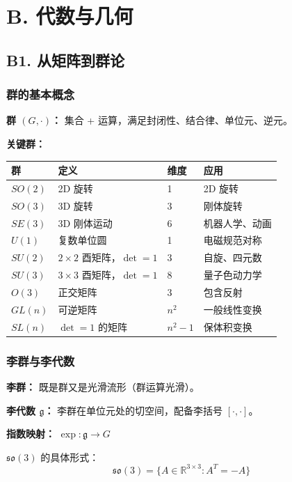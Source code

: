 \section{B. 代数与几何}

\subsection{B1. 从矩阵到群论}

\subsubsection{群的基本概念}

\textbf{群 $(G, \cdot)$：} 集合 + 运算，满足封闭性、结合律、单位元、逆元。

\textbf{关键群：}
\begin{center}
\begin{tabular}{llll}
\toprule
\textbf{群} & \textbf{定义} & \textbf{维度} & \textbf{应用} \\
\midrule
$SO(2)$ & 2D 旋转 & 1 & 2D 旋转 \\
$SO(3)$ & 3D 旋转 & 3 & 刚体旋转 \\
$SE(3)$ & 3D 刚体运动 & 6 & 机器人学、动画 \\
$U(1)$ & 复数单位圆 & 1 & 电磁规范对称 \\
$SU(2)$ & $2\times2$ 酉矩阵，$\det=1$ & 3 & 自旋、四元数 \\
$SU(3)$ & $3\times3$ 酉矩阵，$\det=1$ & 8 & 量子色动力学 \\
$O(3)$ & 正交矩阵 & 3 & 包含反射 \\
$GL(n)$ & 可逆矩阵 & $n^2$ & 一般线性变换 \\
$SL(n)$ & $\det=1$ 的矩阵 & $n^2-1$ & 保体积变换 \\
\bottomrule
\end{tabular}
\end{center}

\subsubsection{李群与李代数}

\textbf{李群：} 既是群又是光滑流形（群运算光滑）。

\textbf{李代数 $\mathfrak{g}$：} 李群在单位元处的切空间，配备李括号 $[\cdot, \cdot]$。

\textbf{指数映射：} $\exp: \mathfrak{g} \to G$

$\mathfrak{so}(3)$ 的具体形式：
\[
\mathfrak{so}(3) = \{A \in \mathbb{R}^{3\times 3} : A^T = -A\}
\]

